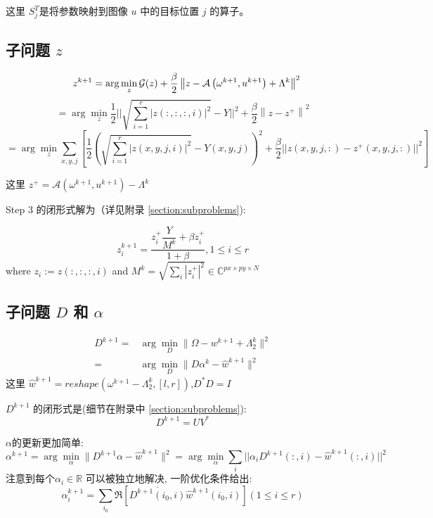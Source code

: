 \documentclass[12pt]{article}
\begin{document}
这里 $S_j^T$是将参数映射到图像 $u$ 中的目标位置 $j$ 的算子。


\subsection{子问题 $z$}
$$
\quad z^{k+1}=\arg \min _{z} \mathcal{G}(z)+\frac{\beta}{2}\left\|z-\mathcal{A}\left(\omega^{k+1}, u^{k+1}\right)+\Lambda^{k}\right\|^{2}\\
$$
$$
=\arg \min _{z} \frac{1}{2}|| \sqrt{ \sum_{i=1}^{r} |z(:,:,:,i)|^2} - Y||^2+\frac{\beta}{2}\left\|z - z^+\right\|^{2}
$$
$$
= \arg \min _{z} \sum_{x,y,j} [\frac{1}{2} ( \sqrt{ \sum_{i=1}^{r} |z(x,y,j,i)|^2} - Y(x,y,j) )^2 +
\frac{\beta}{2}||z(x,y,j,:) - z^+(x,y,j,:)||^2 ]
$$

这里 $z^+ = \mathcal{A}\left(\omega^{k+1}, u^{k+1}\right) - \Lambda^{k}$


Step 3 的闭形式解为（详见附录 \ref{section:subproblems}):

\begin{equation}
z_i^{k+1} = \dfrac{z_i^+ \dfrac{Y}{ M^k} + \beta z_i^+}{1+\beta}, 1 \leq i \leq r
\label{zup}
\end{equation}
where $z_i:= z(:,:,:,i)$ and $M^k =\sqrt{\sum_i |z_i^+|^2} \in \mathbb{C}^{px \times py \times N}$


\subsection{子问题 $D$ 和 $\alpha$} 
$$
\begin{aligned}
D^{k+1} =& \arg \min_{D} \| \Omega -  w^{k+1} + \Lambda_2^{k}\|^{2} \\
=& \arg \min_{D} \| D\alpha^k - \hat {w}^{k+1}\|^{2} 
\end{aligned}
$$
这里 $\hat {w}^{k+1} = reshape( \omega^{k+1} - \Lambda_2^{k},[l,r])$,$D^*D=I$

 $D^{k+1}$ 的闭形式是(细节在附录中 \ref{section:subproblems}):
\begin{equation}
D^{k+1} = UV^*
\label{Dup}
\end{equation}

$\alpha$的更新更加简单:
$$
\alpha^{k+1} = \arg \min_{\alpha} \| D^{k+1}\alpha - \hat {w}^{k+1}\|^{2} 
= \arg \min_{\alpha} \sum_i ||\alpha_i D^{k+1}(:,i) - \hat {w}^{k+1}(:,i)||^2
$$
注意到每个$\alpha_i \in \mathbb{R}$ 可以被独立地解决, 一阶优化条件给出:
\begin{equation}
\label{alpha up}
\alpha_i^{k+1} =  \sum_{i_0} \Re[ \overline{D^{k+1}(i_0,i)} \hat {w}^{k+1}(i_0,i) ]
(1\leq i \leq r)
\end{equation}
\end{document}
